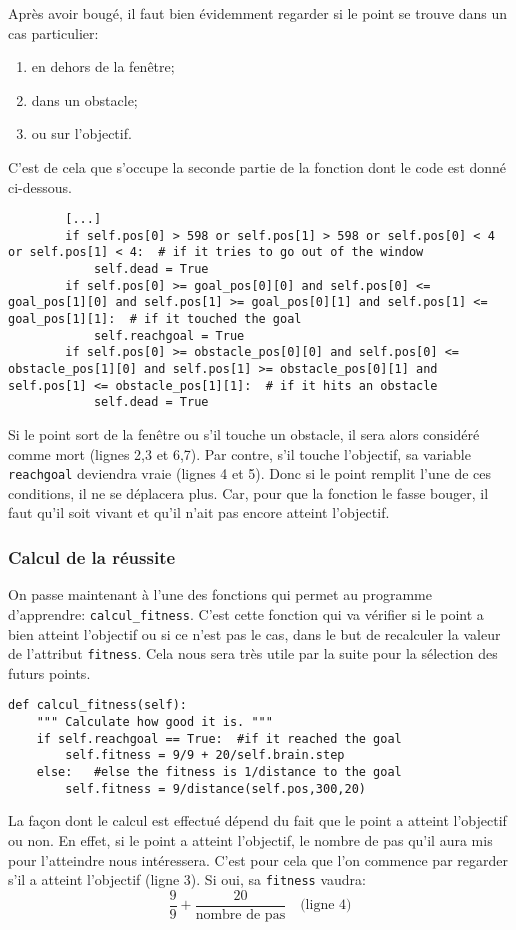 \documentclass[12pt, a4paper, openany]{book}
\begin{document}
Après avoir bougé, il faut bien évidemment regarder si le point se trouve dans un cas particulier:
\begin{enumerate}
	\item en dehors de la fenêtre;
	\item dans un obstacle;
	\item ou sur l'objectif.
\end{enumerate}
C'est de cela que s'occupe la seconde partie de la fonction dont le code est donné ci-dessous.
\begin{verbatim}
		[...]
		if self.pos[0] > 598 or self.pos[1] > 598 or self.pos[0] < 4 or self.pos[1] < 4:  # if it tries to go out of the window
			self.dead = True
		if self.pos[0] >= goal_pos[0][0] and self.pos[0] <= goal_pos[1][0] and self.pos[1] >= goal_pos[0][1] and self.pos[1] <= goal_pos[1][1]:  # if it touched the goal
			self.reachgoal = True
		if self.pos[0] >= obstacle_pos[0][0] and self.pos[0] <= obstacle_pos[1][0] and self.pos[1] >= obstacle_pos[0][1] and self.pos[1] <= obstacle_pos[1][1]:  # if it hits an obstacle
			self.dead = True
\end{verbatim}
Si le point sort de la fenêtre ou s'il touche un obstacle, il sera alors considéré comme \og mort\fg{} (lignes 2,3 et 6,7). Par contre, s'il touche l'objectif, sa variable \verb'reachgoal' deviendra vraie (lignes 4 et 5). Donc si le point remplit l'une de ces conditions, il ne se déplacera plus. Car, pour que la fonction le fasse bouger, il faut qu'il soit \og{}vivant\fg{} et qu'il n'ait pas encore atteint l'objectif.

\subsubsection{Calcul de la réussite}
On passe maintenant à l'une des fonctions qui permet au programme d'apprendre: \verb'calcul_fitness'. C'est cette fonction qui va vérifier si le point a bien atteint l'objectif ou si ce n'est pas le cas, dans le but de recalculer la valeur de l'attribut \verb'fitness'. Cela nous sera très utile par la suite pour la sélection des futurs points.
\begin{verbatim}
def calcul_fitness(self):
	""" Calculate how good it is. """
	if self.reachgoal == True:	#if it reached the goal
		self.fitness = 9/9 + 20/self.brain.step
	else:	#else the fitness is 1/distance to the goal
		self.fitness = 9/distance(self.pos,300,20)
\end{verbatim}
La façon dont le calcul est effectué dépend du fait que le point a atteint l’objectif ou non. En effet, si le point a atteint l'objectif, le nombre de \og pas\fg{} qu'il aura mis pour l'atteindre nous intéressera. C'est pour cela que l'on commence par regarder s'il a atteint l'objectif (ligne 3). Si oui, sa \verb'fitness' vaudra: $$\frac{9}{9} + \frac{20}{\textrm{nombre de pas}}\quad\textrm{(ligne 4)}$$
\end{document}
